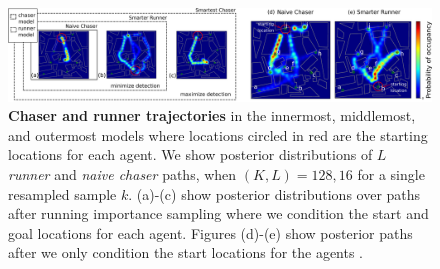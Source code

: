 \documentclass[twoside]{article}
\begin{document}


\begin{figure}
\begin{center}
\centerline{\includegraphics[width=2.0\columnwidth]{occupancy_diagram.eps}}
\caption{ \textbf{Chaser and runner trajectories} in the innermost, middlemost, and outermost models where locations circled in red are the starting locations for each agent. We show posterior distributions of $L$ \textit{runner} and \textit{naive chaser} paths, when $(K,L) = 128, 16$ for a single resampled sample $k$. (a)-(c) show posterior distributions over paths after running importance sampling where we condition the start and goal locations for each agent. Figures (d)-(e) show posterior paths after we only condition the start locations for the agents . %
}
\label{fig:progression}
\end{center}
\vspace{-1em}
\end{figure} 
\end{document}
